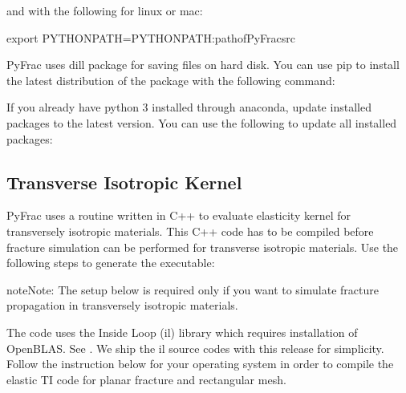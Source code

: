 \documentclass[letterpaper,10pt,english]{sphinxmanual}
\begin{document}
\sphinxAtStartPar
and with the following for linux or mac:

\begin{sphinxVerbatim}[commandchars=\\\{\}]
export PYTHONPATH=\PYGZdl{}\PYGZob{}PYTHONPATH\PYGZcb{}:path\PYGZus{}of\PYGZus{}PyFrac\PYGZus{}src
\end{sphinxVerbatim}

\sphinxAtStartPar
PyFrac uses dill package for saving files on hard disk. You can use pip to install the latest distribution of the package with the following command:

\begin{sphinxVerbatim}[commandchars=\\\{\}]
  
\end{sphinxVerbatim}

\sphinxAtStartPar
If you already have python 3 installed through anaconda, update installed packages to the latest version. You can use the following to update all installed packages:

\begin{sphinxVerbatim}[commandchars=\\\{\}]
  
\end{sphinxVerbatim}


\subsection{Transverse Isotropic Kernel}
\label{\detokenize{GettingStarted:transverse-isotropic-kernel}}
\sphinxAtStartPar
PyFrac uses a routine written in C++ to evaluate elasticity kernel for transversely isotropic materials. This C++ code has to be compiled before fracture simulation can be performed for transverse isotropic materials. Use the following steps to generate the executable:

\begin{sphinxadmonition}{note}{Note:}
\sphinxAtStartPar
The setup below is required only if you want to simulate fracture propagation in transversely isotropic materials.
\end{sphinxadmonition}

\sphinxAtStartPar
The code uses the Inside Loop (il) library which requires installation of OpenBLAS. See . We ship the il source codes with this release for simplicity.  Follow the instruction below for your operating system in order to compile the elastic TI code for planar fracture and rectangular mesh.
\end{document}
